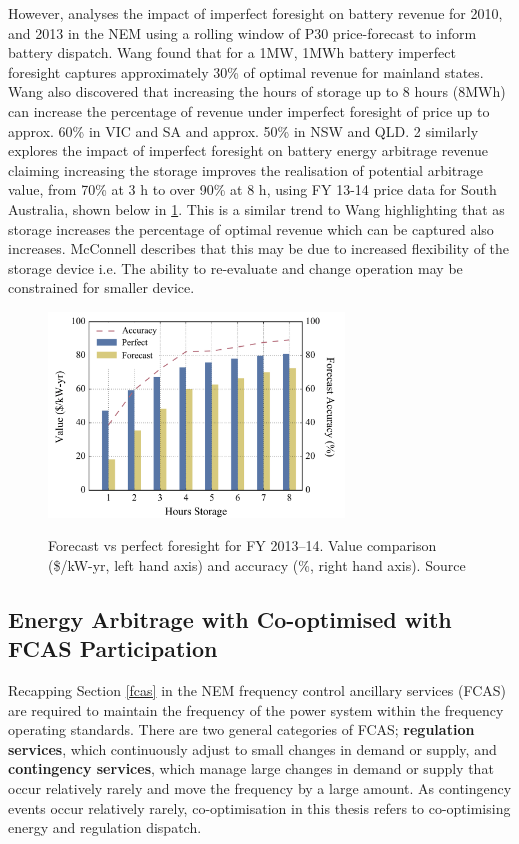 However, \parencite{Wang}  analyses the impact of imperfect foresight on battery revenue for 2010, and 2013 in the NEM using a rolling window of P30 price-forecast to inform battery dispatch. Wang found that for a 1MW, 1MWh battery imperfect foresight captures approximately 30\% of optimal revenue for mainland states. Wang also discovered that increasing the hours of storage up to 8 hours (8MWh) can increase the percentage of revenue under imperfect foresight of price up to approx. 60\% in VIC and SA and approx. 50\% in NSW and QLD.
2
\parencite{McConnell} similarly explores the impact of imperfect foresight on battery energy arbitrage revenue claiming increasing the storage improves the realisation of potential arbitrage value, from 70\% at 3 h to over 90\% at 8 h, using FY 13-14 price data for South Australia, shown below in \ref{fig:mcconnel_2014}. This is a similar trend to Wang highlighting that as storage increases the percentage of optimal revenue which can be captured also increases. McConnell describes that this may be due to increased flexibility of the storage device i.e. The ability to re-evaluate and change operation may be constrained for smaller device. 
\begin{figure}[H]
    \centering
    \includegraphics[width=0.7\textwidth]{Pictures/Chapter2/mcconnel.png}\
    \caption{Forecast vs perfect foresight for FY 2013–14. Value comparison (\$/kW-yr,
left hand axis) and accuracy (\%, right hand axis). Source \parencite{McConnell}}
    \label{fig:mcconnel_2014}
\end{figure}
\subsection{ Energy Arbitrage with Co-optimised with FCAS Participation }
\label{cooptimisation}
Recapping Section \ref{fcas} in the NEM frequency control ancillary services (FCAS) are required to maintain the frequency of the power system within the frequency operating standards. There are two general categories of FCAS; \textbf{regulation services}, which continuously adjust to small changes in demand or supply, and \textbf{contingency services}, which manage large changes in demand or supply that occur relatively rarely and move the frequency by a large amount.
As contingency events occur relatively rarely, co-optimisation in this thesis refers to co-optimising energy and regulation dispatch.

